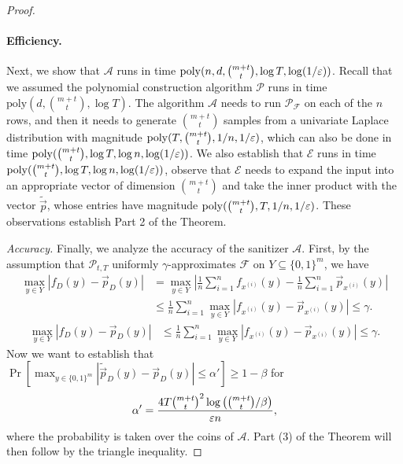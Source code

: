 \documentclass[11pt]{article}
\newcommand\cA{\mathcal{A}}
\newcommand\cE{\mathcal{E}}
\newcommand\cF{\mathcal{F}}
\newcommand\cP{\mathcal{P}}
\newcommand\poly{\mathrm{poly}}
\newcommand\bits{\{0,1\}}
\newcommand{\prob}[1]{\Pr\left[#1\right]}
\theoremstyle{definition}
\begin{document}
\begin{proof}
\paragraph{Efficiency.}
Next, we show that $\cA$ runs in time $\poly(n, d,\binom{m+t}{t}, \log T, \log(1/\eps))$.  Recall that we assumed the polynomial construction algorithm $\cP$ runs in time $\poly(d, \binom{m+t}{t}, \log T)$.  The algorithm $\cA$ needs to run $\cP_{\cF}$ on each of the $n$ rows, and then it needs to generate $\binom{m+t}{t}$ samples from a univariate Laplace distribution with magnitude $\poly(T, \binom{m+t}{t}, 1/n, 1/\eps)$, which can also be done in time $\poly(\binom{m+t}{t}, \log T, \log n, \log(1/\eps))$.  We also establish that $\cE$ runs in time $\poly(\binom{m+t}{t}, \log T, \log n, \log(1/\eps))$, observe that $\cE$ needs to expand the input into an appropriate vector of dimension $\binom{m+t}{t}$ and take the inner product with the vector $\tilde{\vec{p}}$, whose entries have magnitude $\poly(\binom{m+t}{t}, T, 1/n, 1/\eps)$.  These observations establish Part 2 of the Theorem.

\medskip

\noindent
\textit{Accuracy.}
Finally, we analyze the accuracy of the sanitizer $\cA$.  First, by the assumption that $\cP_{t, T}$ uniformly $\gamma$-approximates $\cF$ on $Y \subseteq \bits^m$, we have
\ifnum{}
\begin{align*}
\max_{y \in Y} \left| f_{D}(y) - \vec{p}_{D}(y) \right| 
&={} \max_{y \in Y} \left| \frac{1}{n} \sum_{i=1}^{n} f_{x^{(i)}}(y) - \frac{1}{n} \sum_{i=1}^{n} \vec{p}_{x^{(i)}}(y) \right| \\
&\leq{} \frac{1}{n} \sum_{i=1}^{n} \max_{y \in Y} \left| f_{x^{(i)}}(y) - \vec{p}_{x^{(i)}}(y) \right|
\leq{} \gamma.
\end{align*}
\else
\begin{align*}
\max_{y \in Y} \left| f_{D}(y) - \vec{p}_{D}(y) \right| 
&\leq{} \frac{1}{n} \sum_{i=1}^{n} \max_{y \in Y} \left| f_{x^{(i)}}(y) - \vec{p}_{x^{(i)}}(y) \right|
\leq{} \gamma.
\end{align*}
\fi
Now we want to establish that 
$
\prob{\max_{y \in \bits^m} \left| \tilde{\vec{p}}_{D}(y) - \vec{p}_{D}(y) \right| \leq \alpha'} \geq 1-\beta
$
for $$\alpha' = \frac{4T\binom{m+t}{t}^2 \log\left( \binom{m+t}{t} /\beta \right) }{ \varepsilon n},$$ where the probability is taken over the coins of $\cA$.  Part (3) of the Theorem will then follow by the triangle inequality.


\end{proof}
\end{document}

